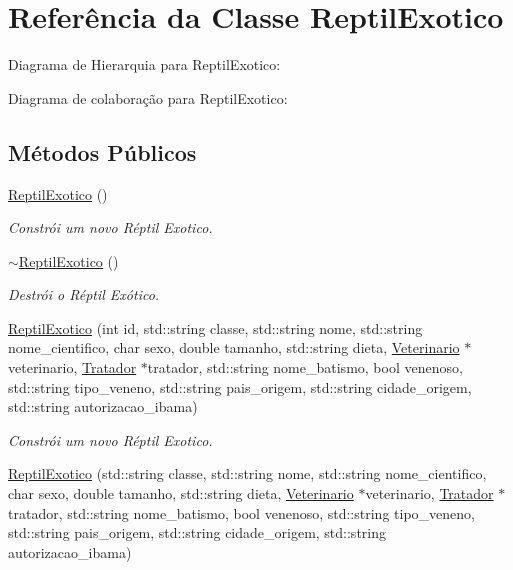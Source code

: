 \hypertarget{classReptilExotico}{}\section{Referência da Classe Reptil\+Exotico}
\label{classReptilExotico}


Diagrama de Hierarquia para Reptil\+Exotico\+:


Diagrama de colaboração para Reptil\+Exotico\+:
\subsection*{Métodos Públicos}
\begin{DoxyCompactItemize}
\item 
\mbox{\label{classReptilExotico_a0f9104f7cbed74d52a6711c03cd75003}} 
\hyperlink{classReptilExotico_a0f9104f7cbed74d52a6711c03cd75003}{Reptil\+Exotico} ()
\begin{DoxyCompactList}\small\item\em Constrói um novo Réptil Exotico. \end{DoxyCompactList}\item 
\mbox{\label{classReptilExotico_abddaff7d11fd31ce5fcd4a2c1b4ee6f1}} 
\hyperlink{classReptilExotico_abddaff7d11fd31ce5fcd4a2c1b4ee6f1}{$\sim$\+Reptil\+Exotico} ()
\begin{DoxyCompactList}\small\item\em Destrói o Réptil Exótico. \end{DoxyCompactList}\item 
\hyperlink{classReptilExotico_a116a23b987d0470f9631e04ee4c99a3b}{Reptil\+Exotico} (int id, std\+::string classe, std\+::string nome, std\+::string nome\+\_\+cientifico, char sexo, double tamanho, std\+::string dieta, \hyperlink{classVeterinario}{Veterinario} $\ast$veterinario, \hyperlink{classTratador}{Tratador} $\ast$tratador, std\+::string nome\+\_\+batismo, bool venenoso, std\+::string tipo\+\_\+veneno, std\+::string pais\+\_\+origem, std\+::string cidade\+\_\+origem, std\+::string autorizacao\+\_\+ibama)
\begin{DoxyCompactList}\small\item\em Constrói um novo Réptil Exotico. \end{DoxyCompactList}\item 
\hyperlink{classReptilExotico_ac94be36ef3b9bcf3045bf4cba09fe2c0}{Reptil\+Exotico} (std\+::string classe, std\+::string nome, std\+::string nome\+\_\+cientifico, char sexo, double tamanho, std\+::string dieta, \hyperlink{classVeterinario}{Veterinario} $\ast$veterinario, \hyperlink{classTratador}{Tratador} $\ast$tratador, std\+::string nome\+\_\+batismo, bool venenoso, std\+::string tipo\+\_\+veneno, std\+::string pais\+\_\+origem, std\+::string cidade\+\_\+origem, std\+::string autorizacao\+\_\+ibama)

\end{DoxyCompactItemize}
